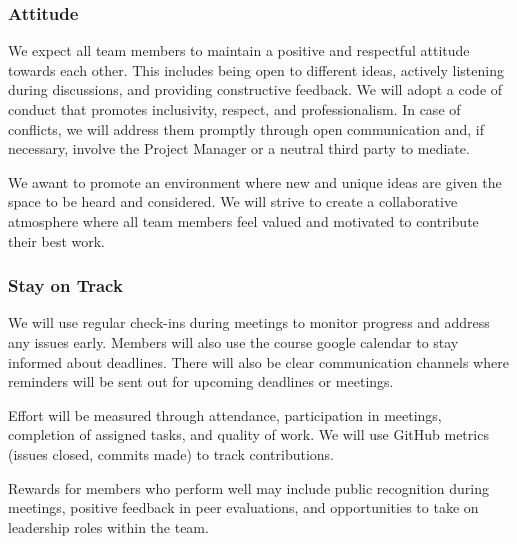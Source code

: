 \documentclass{article}
\begin{document}
\subsubsection*{Attitude}


We expect all team members to maintain a positive and respectful attitude towards each other. This includes being open to different ideas, actively listening during discussions, and providing constructive feedback.
We will adopt a code of conduct that promotes inclusivity, respect, and professionalism. In case of conflicts, we will address them promptly through open communication and, if necessary, involve the Project Manager or a neutral third party to mediate.

We awant to promote an environment where new and unique ideas are given the space to be heard and considered. We will strive to create a collaborative atmosphere where all team members feel valued and motivated to contribute their best work.

\subsubsection*{Stay on Track}


We will use regular check-ins during meetings to monitor progress and address any issues early. Members will also use the course google calendar to stay informed about deadlines. There will also be clear communication channels where reminders will be sent out for upcoming deadlines or meetings.

Effort will be measured through attendance, participation in meetings, completion of assigned tasks, and quality of work. We will use GitHub metrics (issues closed, commits made) to track contributions.

Rewards for members who perform well may include public recognition during meetings, positive feedback in peer evaluations, and opportunities to take on leadership roles within the team.
\end{document}
